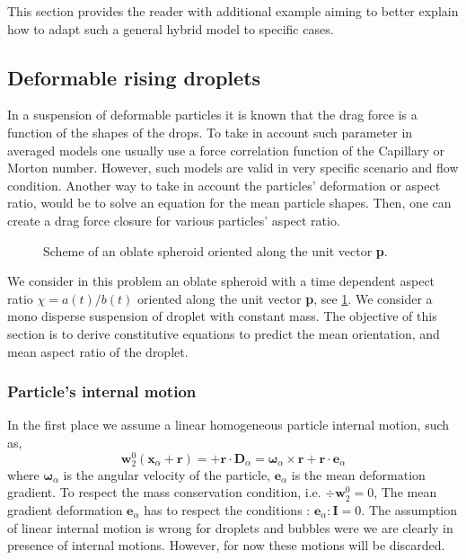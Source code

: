 This section provides the reader with additional example aiming to better explain how to adapt such a general hybrid model to specific cases. 

\subsection{Deformable rising droplets}

In a suspension of deformable particles it is known that the drag force is a function of the shapes of the drops.
To take in account such parameter in averaged models one usually use a force correlation function of the Capillary or Morton number. 
However, such models are valid in very specific scenario and flow condition. 
Another way to take in account the particles' deformation or aspect ratio, would be to solve an equation for the mean particle shapes. 
Then, one can create a drag force closure for various particles' aspect ratio. 

\begin{figure}[h!]
    \centering
    \hfill
    \hfill
    \caption{Scheme of an  oblate spheroid oriented along the unit vector \textbf{p}.}
    \label{fig:scheme2}
\end{figure}
We consider in this problem an oblate spheroid with a time dependent aspect ratio $\chi = a(t)/b(t)$ oriented along the unit vector \textbf{p}, see \ref{fig:scheme2}.
We consider a mono disperse suspension of droplet with constant mass. 
The objective of this section is to derive constitutive equations to predict the mean orientation, and mean aspect ratio of the droplet. 

\subsubsection{Particle's internal motion}

In the first place we assume a linear homogeneous particle internal motion, such as, 
\begin{equation}
    \textbf{w}_2^0(\textbf{x}_\alpha+ \textbf{r})
    = 
    + \textbf{r} \cdot \textbf{D}_\alpha
    = 
    \bm{\omega}_\alpha \times \textbf{r} 
    + \textbf{r} \cdot \textbf{e}_\alpha
\end{equation}
where $\bm{\omega}_\alpha$ is the angular velocity of the particle, $\textbf{e}_\alpha$ is the mean deformation gradient. 
To respect the mass conservation condition, i.e. $\div \textbf{w}_2^0 =0$, The mean gradient deformation $\textbf{e}_\alpha$ has to respect the conditions : $\textbf{e}_\alpha:\textbf{I}=0$. 
The assumption of linear internal motion is wrong for droplets and bubbles were we are clearly in presence of internal motions. 
However, for now these motions will be discarded. 

